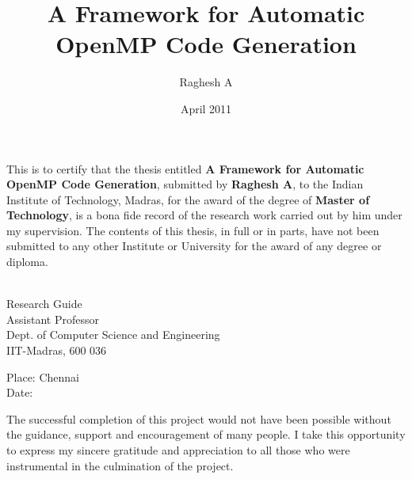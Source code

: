 \documentclass[MTech]{iitmdiss}
\def\thesistitle{A Framework for Automatic\\OpenMP Code Generation}
\def\thesisauthor{Raghesh A}
\begin{document}


\title{\thesistitle}

\author{\thesisauthor}

\date{April 2011}

\begin{singlespace}
\maketitle 
\end{singlespace} 



\certificate

\vspace*{0.5in}

\noindent This is to certify that the thesis entitled %
{\bf {A Framework for Automatic OpenMP Code Generation}},
submitted by {\bf {\thesisauthor}}, to the Indian Institute of Technology, 
Madras, for the award of the degree of {\bf Master of Technology}, 
is a bona fide record of the research work carried out by him under my
supervision. The contents of this thesis, in full or in parts, have not been
submitted to any other Institute or University for the award of any degree or
diploma.

\vspace*{1.4in}
\hspace*{-0.25in}
\begin{singlespace}
 \\
\noindent Research Guide \\ 
\noindent Assistant Professor \\
\noindent Dept. of Computer Science and Engineering\\
\noindent IIT-Madras, 600 036 \\
\end{singlespace}
\vspace*{0.20in}
\noindent Place: Chennai\\ 
Date:

\acknowledgements
The successful completion of this project would not have been possible
without the guidance, support and encouragement of many people. I take
this opportunity to express my sincere gratitude and appreciation to all
those who were instrumental in the culmination of the project.
\end{document}
